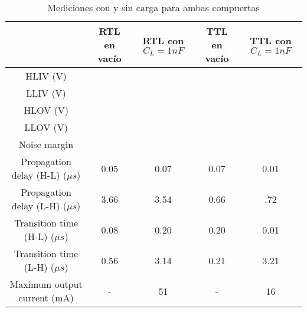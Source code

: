 \documentclass[../../e3_tp2_main.tex]{subfiles}
\begin{document}
\begin{table*}[t]
	\begin{tabular}{|c|c|c|c|c|}
	\hline
                                  				& RTL en vac\'io	& RTL con $C_L=1nF$ & TTL en vac\'io & TTL con $C_L=1nF$ \\ \hline \hline
	HLIV (V)                          			&                      &                   &                               &                   \\ \hline
	LLIV (V)                          			&                      &                   &                               &                   \\ \hline
	HLOV (V)                          			&                      &                   &                               &                   \\ \hline
	LLOV (V)                          			&                      &                   &                               &                   \\ \hline
	Noise margin                      		&                      &                   &                               &                   \\ \hline
	Propagation delay (H-L) ($\mu s$)	& 0.05               & 0.07              & 0.07                          & 0.01              \\ \hline
	Propagation delay (L-H) ($\mu s$) 	& 3.66               & 3.54              & 0.66                          & .72               \\ \hline
	Transition time (H-L) ($\mu s$)   	& 0.08               & 0.20              & 0.20                          & 0.01              \\ \hline
	Transition time (L-H) ($\mu s$)   	& 0.56               & 3.14              & 0.21                          & 3.21              \\ \hline
	Maximum output current (mA)       	& -                    & 51                & -                             & 16                \\ \hline

	\end{tabular}
	
	\caption{Mediciones con y sin carga para ambas compuertas}
	\label{table:1-mediciones}
\end{table*}
\end{document}
